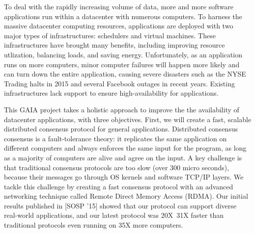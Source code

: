 {}



To deal with the rapidly increasing volume of data, more and more software
applications run within a datacenter with numerous computers. To harness the 
massive datacenter computing resources, applications are deployed with two 
major 
types of infrastructures: schedulers and virtual machines. These 
infrastructures have brought many benefits, including improving resource 
utlization, balancing loads, and saving energy. Unfortunately, as an 
application 
runs on more computers, minor computer failures will happen more likely and can 
turn down the entire application, causing severe disasters such as the NYSE 
Trading halts in 2015 and several Facebook outages in recent years. Existing 
infrastructures lack support to ensure high-availability for applications.

This GAIA project takes a holistic approach to improve the the availability of 
datacenter applications, with three objectives. First, we will create a fast, 
scalable distributed consensus protocol for general applications. Distributed 
consensus consensus is a fault-tolerance theory: it replicates the same 
application on different computers and always enforces the same input for the 
program, as long as a majority of computers are alive and agree on the input. A 
key challenge is that traditional consensus protocols are too slow (over 300 
micro seconds), because their messages go through OS kernels and software 
TCP/IP layers. We tackle this challenge by creating a fast consensus protocol 
with an advanced networking technique called Remote Direct Memory Access 
(RDMA). Our initial results published in [SOSP '15] showed that our protocol 
can support diverse real-world applications, and our latest protocol was 
20X~31X faster than traditional protocols even running on 35X more computers.



